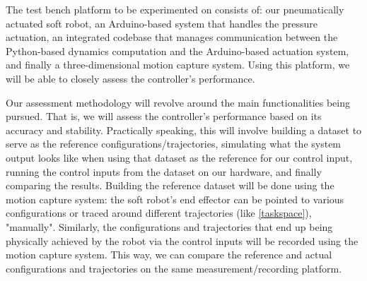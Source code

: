 The test bench platform to be experimented on consists of: our pneumatically actuated soft robot, an Arduino-based system that handles the pressure actuation, an integrated codebase that manages communication between the Python-based dynamics computation and the Arduino-based actuation system, and finally a three-dimensional motion capture system. Using this platform, we will be able to closely assess the controller's performance. 

Our assessment methodology will revolve around the main functionalities being pursued. That is, we will assess the controller's performance based on its accuracy and stability. Practically speaking, this will involve building a dataset to serve as the reference configurations/trajectories, simulating what the system output looks like when using that dataset as the reference for our control input, running the control inputs from the dataset on our hardware, and finally comparing the results. Building the reference dataset will be done using the motion capture system: the soft robot's end effector can be pointed to various configurations or traced around different trajectories (like \autoref{taskspace}), "manually". Similarly, the configurations and trajectories that end up being physically achieved by the robot via the control inputs will be recorded using the motion capture system. This way, we can compare the reference and actual configurations and trajectories on the same measurement/recording platform.

